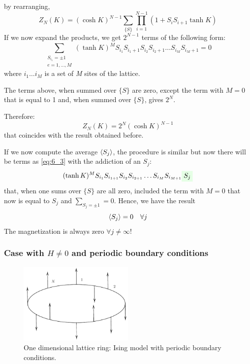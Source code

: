 \documentclass[../../Main/Main.tex]{subfiles}
\begin{document}
by rearranging,
\begin{equation}
  Z_N (K)= (\cosh K)^{N-1} \sum_{\{S\}}^{}  \prod_{i=1}^{N-1} ( 1 + S_i S_{i+1} \tanh K )
\end{equation}
If we now expand the products, we get \( 2^{N-1} \) terms of the following form:
\begin{equation}
  \sum_{ \substack{ S_{i_e} = \pm 1\\ e= 1, \dots, M} }^{}  (\tanh K )^M S_{i_1} S_{i_{1}+1} S_{i_2} S_{i_{2}+1} \dots S_{i_M} S_{i_{M}+1} = 0
  \label{eq:6_3}
\end{equation}
where \( i_1 \dots i_M \) is a set of \emph{M} sites of the lattice.
\begin{remark}
The terms above, when summed over \( \{ S \}   \) are zero, except the term with \( M=0 \) that is equal to 1 and, when summed over \( \{ S \}   \), gives \( 2^N \).
\end{remark}
Therefore:
\begin{equation*}
  Z_N (K) = 2^N (\cosh K)^{N-1}
\end{equation*}
that coincides with the result obtained before.

 If we now compute the average \( \expval{S_j}  \), the procedure is similar but now there will be terms as \eqref{eq:6_3} with the addiction of an \( S_j \):
\begin{equation}
  (\tanh K)^M S_{i_1} S_{i_{1+1}} S_{i_2} S_{i_{2+1}} \dots S_{i_M} S_{i_{M+1}} \mathcolorbox{green!10}{S_j}
\end{equation}
that, when one sums over \( \{ S \}   \) are all zero, included the term with \( M=0 \) that now is equal to \( S_j \) and \( \sum_{S_j = \pm 1}^{} = 0   \). Hence, we have the result
\begin{equation}
  \expval{S_j} = 0 \quad \forall j
\end{equation}
The magnetization is always zero \( \forall j \neq \infty  \)!


\subsubsection{Case with \( H\neq0 \) and periodic boundary conditions}

\begin{figure}[h!]
\centering
\includegraphics[width=0.5\textwidth]{./img/4__1.pdf}
\caption{\label{fig:6_4} One dimensional lattice ring: Ising model with periodic boundary conditions.}
\end{figure}
\end{document}
